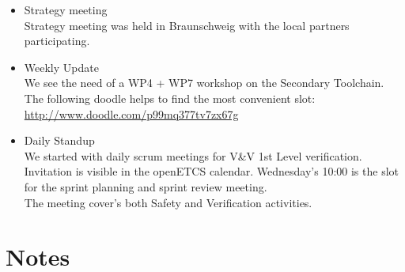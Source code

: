 \documentclass[a4paper, 11pt]{article}
\begin{document}
\begin{itemize}
\item Strategy meeting\\
Strategy meeting was held in Braunschweig with the local partners participating.

\item Weekly Update\\
We see the need of a WP4 + WP7 workshop on the Secondary Toolchain. The following doodle helps  to find the most convenient slot: \url{http://www.doodle.com/p99mq377tv7zx67g}

\item Daily Standup\\
We started with daily scrum meetings for V\&V 1st Level verification. Invitation is visible in the openETCS calendar. Wednesday's  10:00 is the slot for the sprint planning and sprint review meeting.\\
The meeting cover's both Safety and Verification activities.
\end{itemize}


\section{Notes}
\end{document}
